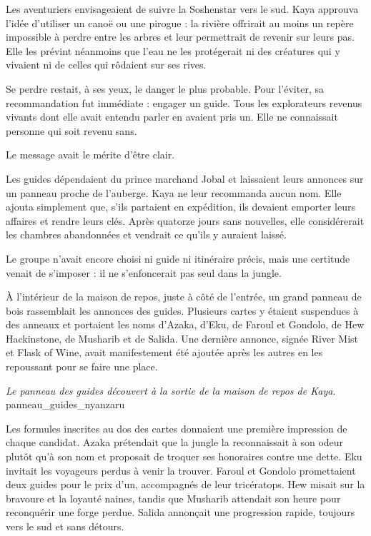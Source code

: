Les aventuriers envisageaient de suivre la Soshenstar vers le sud. Kaya approuva l'idée d'utiliser un canoë ou une pirogue : la rivière offrirait au moins un repère impossible à perdre entre les arbres et leur permettrait de revenir sur leurs pas. Elle les prévint néanmoins que l'eau ne les protégerait ni des créatures qui y vivaient ni de celles qui rôdaient sur ses rives.

Se perdre restait, à ses yeux, le danger le plus probable. Pour l'éviter, sa recommandation fut immédiate : engager un guide. Tous les explorateurs revenus vivants dont elle avait entendu parler en avaient pris un. Elle ne connaissait personne qui soit revenu sans.

Le message avait le mérite d'être clair.

Les guides dépendaient du prince marchand Jobal et laissaient leurs annonces sur un panneau proche de l'auberge. Kaya ne leur recommanda aucun nom. Elle ajouta simplement que, s'ils partaient en expédition, ils devaient emporter leurs affaires et rendre leurs clés. Après quatorze jours sans nouvelles, elle considérerait les chambres abandonnées et vendrait ce qu'ils y auraient laissé.

Le groupe n'avait encore choisi ni guide ni itinéraire précis, mais une certitude venait de s'imposer : il ne s'enfoncerait pas seul dans la jungle.


\scenebreak

À l'intérieur de la maison de repos, juste à côté de l'entrée, un grand panneau de bois rassemblait les annonces des guides. Plusieurs cartes y étaient suspendues à des anneaux et portaient les noms d'Azaka, d'Eku, de Faroul et Gondolo, de Hew Hackinstone, de Musharib et de Salida. Une dernière annonce, signée River Mist et Flask of Wine, avait manifestement été ajoutée après les autres en les repoussant pour se faire une place.

{\textit{Le panneau des guides découvert à la sortie de la maison de repos de Kaya.}}
{panneau_guides_nyanzaru}

Les formules inscrites au dos des cartes donnaient une première impression de chaque candidat. Azaka prétendait que la jungle la reconnaissait à son odeur plutôt qu'à son nom et proposait de troquer ses honoraires contre une dette. Eku invitait les voyageurs perdus à venir la trouver. Faroul et Gondolo promettaient deux guides pour le prix d'un, accompagnés de leur tricératops. Hew misait sur la bravoure et la loyauté naines, tandis que Musharib attendait son heure pour reconquérir une forge perdue. Salida annonçait une progression rapide, toujours vers le sud et sans détours.

